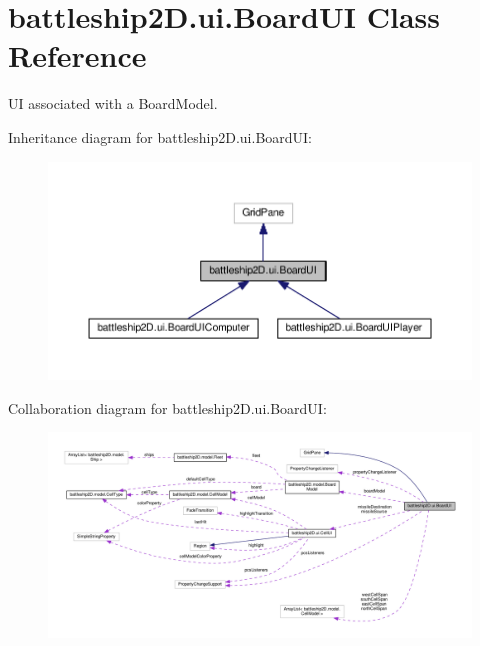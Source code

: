 \hypertarget{classbattleship2D_1_1ui_1_1BoardUI}{\section{battleship2\-D.\-ui.\-Board\-U\-I Class Reference}
\label{classbattleship2D_1_1ui_1_1BoardUI}
}


U\-I associated with a Board\-Model.  




Inheritance diagram for battleship2\-D.\-ui.\-Board\-U\-I\-:\nopagebreak
\begin{figure}[H]
\begin{center}
\leavevmode
\includegraphics[width=350pt]{classbattleship2D_1_1ui_1_1BoardUI__inherit__graph}
\end{center}
\end{figure}


Collaboration diagram for battleship2\-D.\-ui.\-Board\-U\-I\-:\nopagebreak
\begin{figure}[H]
\begin{center}
\leavevmode
\includegraphics[width=350pt]{classbattleship2D_1_1ui_1_1BoardUI__coll__graph}
\end{center}
\end{figure}
